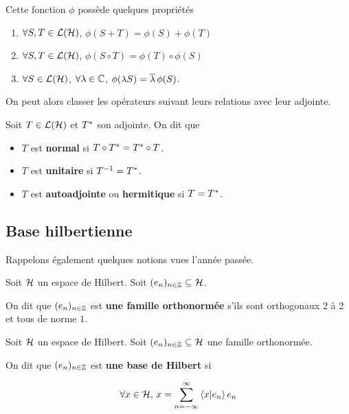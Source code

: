 Cette fonction $\phi$ possède quelques propriétés

\begin{enumerate}
	\item $\forall S, T \in \mathcal{L}(\mathcal{H})$, $\phi(S + T) =
		\phi(S) + \phi(T)$
	\item $\forall S, T \in \mathcal{L}(\mathcal{H})$, $\phi(S \circ T) = \phi(T)
		\circ \phi(S)$
	\item $\forall S \in \mathcal{L}(\mathcal{H})$, $\forall \lambda \in
		\mathbb{C}$, $\phi(\lambda S) = \overline{\lambda} \, \phi(S)$.
\end{enumerate}

On peut alors classer les opérateurs suivant leurs relations avec leur adjointe.

\begin{definition}
	Soit $T \in \mathcal{L}(\mathcal{H})$ et $T^{*}$ son adjointe. On
	dit que
	\begin{itemize}
		\item $T$ est \textbf{normal} si $T \circ T^{*} = T^{*}
			\circ T$.
		\item $T$ est \textbf{unitaire} si $T^{-1} = T^{*}$.
		\item $T$ est \textbf{autoadjointe} ou \textbf{hermitique} si $T =
			T^{*}$.
	\end{itemize}
\end{definition}
\subsection{Base hilbertienne}

Rappelons également quelques notions vues l'année passée.

\begin{definition}
	Soit $\mathcal{H}$ un espace de Hilbert.
	Soit $(e_{n})_{n \in \mathbb{Z}} \subseteq \mathcal{H}$.

	On dit que $(e_{n})_{n \in \mathbb{Z}}$ est \textbf{une famille
	orthonormée} s'ils sont orthogonaux 2 à 2 et tous de norme $1$.
\end{definition}

\begin{definition}
	Soit $\mathcal{H}$ un espace de Hilbert.
	Soit $(e_{n})_{n \in \mathbb{Z}} \subseteq \mathcal{H}$ une famille
	orthonormée.

	On dit que $(e_{n})_{n \in \mathbb{Z}}$ est \textbf{une base de Hilbert} si

	\begin{equation}
	\forall x \in \mathcal{H}, \, x = \displaystyle \sum_{n = -\infty}^{\infty}
	\bra{x}\ket{e_{n}} e_{n}
	\end{equation}
\end{definition}



